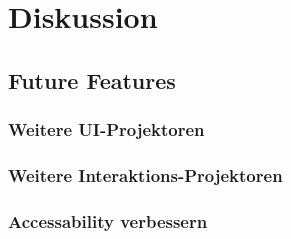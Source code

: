 \chapter{Diskussion}
\label{chap:discussion}



\section{Future Features}
\label{sec:future}


\subsection{Weitere UI-Projektoren}
\label{sec:moreUi}


\subsection{Weitere Interaktions-Projektoren}
\label{sec:moreInteraction}


\subsection{Accessability verbessern}
\label{sec:betterAccessability}

